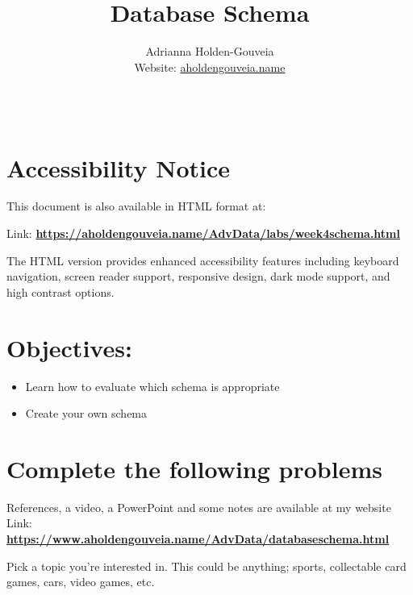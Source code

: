 \documentclass[12pt]{article}
\title{Database Schema}
\author{
        Adrianna Holden-Gouveia \\
        Website: \href{https://aholdengouveia.name}{aholdengouveia.name}\\ 
        \date{\vspace{-5ex}}
        \faGithub {: aholdengouveia} \\
        }
\begin{document}
    

\maketitle



\section*{Accessibility Notice}
This document is also available in HTML format at:

Link: \href{https://aholdengouveia.name/AdvData/labs/week4schema.html}{\textbf{https://aholdengouveia.name/AdvData/labs/week4schema.html}}

The HTML version provides enhanced accessibility features including keyboard navigation, screen reader support, responsive design, dark mode support, and high contrast options.

\section*{Objectives:}
\begin{itemize}
    \item Learn how to evaluate which schema is appropriate
    \item Create your own schema
\end{itemize}
\section*{Complete the following problems}

References, a video, a PowerPoint and some notes are available at my website
Link: \href{https://www.aholdengouveia.name/AdvData/databaseschema.html}{\textbf{https://www.aholdengouveia.name/AdvData/databaseschema.html}}

Pick a topic you're interested in.  This could be anything; sports, collectable card games, cars, video games, etc. 
\end{document}
